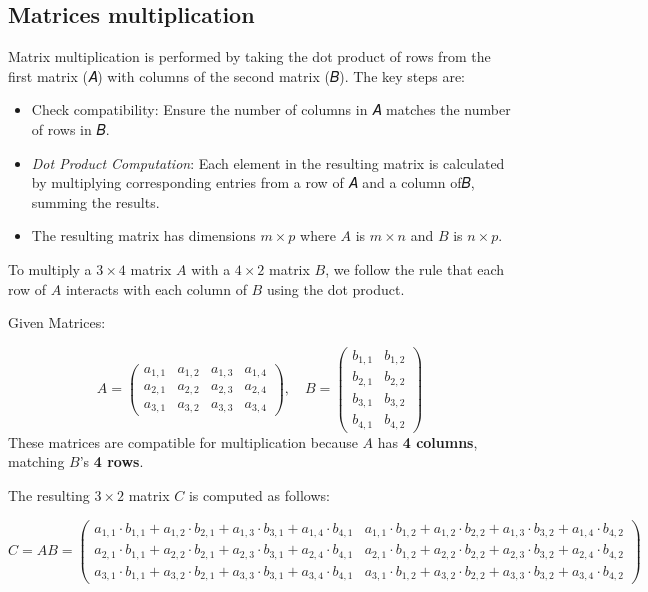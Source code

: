 \documentclass[
  letterpaper,
  DIV=11,
  numbers=noendperiod]{scrartcl}
\begin{document}
\subsection{Matrices multiplication}\label{matrices-multiplication}

Matrix multiplication is performed by taking the dot product of rows
from the first matrix (𝐴) with columns of the second matrix (𝐵). The key
steps are:

\begin{itemize}
\item
  Check compatibility: Ensure the number of columns in 𝐴 matches the
  number of rows in 𝐵.
\item
  \emph{Dot Product Computation}: Each element in the resulting matrix
  is calculated by multiplying corresponding entries from a row of 𝐴 and
  a column of𝐵, summing the results.
\item
  The resulting matrix has dimensions \(m \times p\) where \(A\) is
  \(m \times n\) and \(B\) is \(n \times p\).
\end{itemize}

To multiply a \(3 \times 4\) matrix \(A\) with a \(4 \times 2\) matrix
\(B\), we follow the rule that each row of \(A\) interacts with each
column of \(B\) using the dot product.

Given Matrices:

\[
A = \begin{pmatrix}
a_{1,1} & a_{1,2} & a_{1,3} & a_{1,4} \\
a_{2,1} & a_{2,2} & a_{2,3} & a_{2,4} \\
a_{3,1} & a_{3,2} & a_{3,3} & a_{3,4}
\end{pmatrix}, \quad
B = \begin{pmatrix}
b_{1,1} & b_{1,2} \\
b_{2,1} & b_{2,2} \\
b_{3,1} & b_{3,2} \\
b_{4,1} & b_{4,2}
\end{pmatrix}
\] These matrices are compatible for multiplication because \(A\) has
\textbf{4 columns}, matching \(B\)'s \textbf{4 rows}.

The resulting \(3 \times 2\) matrix \(C\) is computed as follows:

\[
C = A B =
\begin{pmatrix}
a_{1,1} \cdot b_{1,1} + a_{1,2} \cdot b_{2,1} + a_{1,3} \cdot b_{3,1} + a_{1,4} \cdot b_{4,1} &
a_{1,1} \cdot b_{1,2} + a_{1,2} \cdot b_{2,2} + a_{1,3} \cdot b_{3,2} + a_{1,4} \cdot b_{4,2} \\
a_{2,1} \cdot b_{1,1} + a_{2,2} \cdot b_{2,1} + a_{2,3} \cdot b_{3,1} + a_{2,4} \cdot b_{4,1} &
a_{2,1} \cdot b_{1,2} + a_{2,2} \cdot b_{2,2} + a_{2,3} \cdot b_{3,2} + a_{2,4} \cdot b_{4,2} \\
a_{3,1} \cdot b_{1,1} + a_{3,2} \cdot b_{2,1} + a_{3,3} \cdot b_{3,1} + a_{3,4} \cdot b_{4,1} &
a_{3,1} \cdot b_{1,2} + a_{3,2} \cdot b_{2,2} + a_{3,3} \cdot b_{3,2} + a_{3,4} \cdot b_{4,2}
\end{pmatrix}
\]
\end{document}
